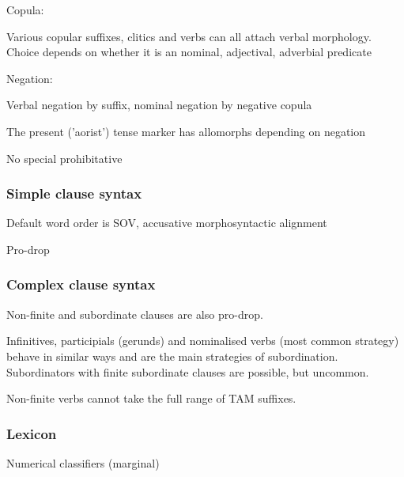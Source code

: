 \documentclass[a4paper, 11pt]{book}
\begin{document}
\begin{itemize*}
\item Copula:
\begin{itemize*}
	\item Various copular suffixes, clitics and verbs can all attach verbal morphology. Choice depends on whether it is an nominal, adjectival, adverbial predicate
\end{itemize*}

\item Negation:
\begin{itemize*}
	\item Verbal negation by suffix, nominal negation by negative copula
	\item The present ('aorist') tense marker has allomorphs depending on negation 
	\item No special prohibitative
\end{itemize*}
\end{itemize*}

\subsubsection*{Simple clause syntax}
\begin{itemize*}
\item Default word order is SOV, accusative morphosyntactic alignment
\item Pro-drop
\end{itemize*}
 

\subsubsection*{Complex clause syntax}
\begin{itemize*}
\item Non-finite and subordinate clauses are also pro-drop.
\item Infinitives, participials (gerunds) and nominalised verbs (most common strategy) behave in similar ways and are the main strategies of subordination. Subordinators with finite subordinate clauses are possible, but uncommon. 
\item Non-finite verbs cannot take the full range of TAM suffixes.
\end{itemize*}

\subsubsection*{Lexicon}
\begin{itemize*}
\item Numerical classifiers (marginal)
\end{itemize*}
\end{document}

